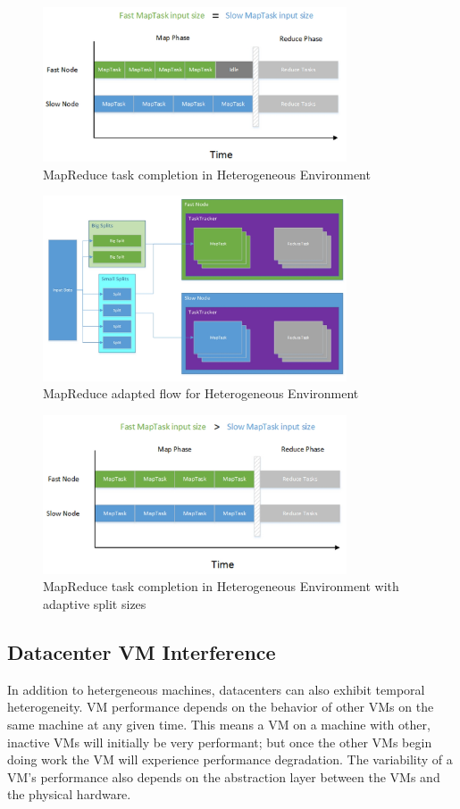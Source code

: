 \begin{figure}[ht!]
\centering
\includegraphics[width=90mm]{heterogeneous_time.jpg}
\caption{MapReduce task completion in Heterogeneous Environment}
\label{fig:heterogeneous_time}
\end{figure}

\begin{figure}[ht!]
\centering
\includegraphics[width=90mm]{adaptive_mr.jpg}
\caption{MapReduce adapted flow for Heterogeneous Environment}
\label{fig:adaptive_mr}
\end{figure}

\begin{figure}[ht!]
\centering
\includegraphics[width=90mm]{adaptive_time.jpg}
\caption{MapReduce task completion in Heterogeneous Environment with adaptive split sizes}
\label{fig:adaptive_time}
\end{figure}

\subsection{Datacenter VM Interference}
\label{sec:interference}
In addition to hetergeneous machines, datacenters can also exhibit temporal heterogeneity.
VM performance depends on the behavior of other VMs on the same machine at any given time.
This means a VM on a machine with other, inactive VMs will initially be very performant;
but once the other VMs begin doing work the VM will experience performance degradation.
The variability of a VM's performance also depends on the abstraction layer between the VMs
and the physical hardware.

